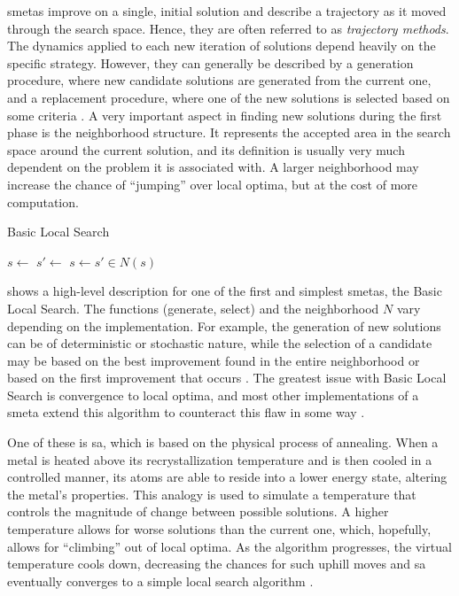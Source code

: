 \Glspl{smeta} improve on a single, initial solution and describe a trajectory as it moved through the search space. Hence, they are often referred to as \textit{trajectory methods}. The dynamics applied to each new iteration of solutions depend heavily on the specific strategy. However, they can generally be described by a generation procedure, where new candidate solutions are generated from the current one, and a replacement procedure, where one of the new solutions is selected based on some criteria \cite{talbi2009metaheuristics}. A very important aspect in finding new solutions during the first phase is the neighborhood structure. It represents the accepted area in the search space around the current solution, and its definition is usually very much dependent on the problem it is associated with. A larger neighborhood may increase the chance of \enquote{jumping} over local optima, but at the cost of more computation.
\begin{algorithm}
	\caption{Basic Local Search}
	\label{alg:basiclocalsearch}
	
	\begin{algorithmic}
		
		\State $s \gets $ 
		\Repeat
		\State $ s'  \gets $ 
		\State $ s \gets s' \in N(s)$
		\EndIf
	\end{algorithmic}
\end{algorithm}

  shows a high-level description for one of the first and simplest \glspl{smeta}, the Basic Local Search. The functions (generate, select) and the neighborhood $N$ vary depending on the implementation. For example, the generation of new solutions can be of deterministic or stochastic nature, while the selection of a candidate may be based on the best improvement found in the entire neighborhood or based on the first improvement that occurs \cite{talbi2009metaheuristics}. The greatest issue with Basic Local Search is convergence to local optima, and most other implementations of a \gls{smeta} extend this algorithm to counteract this flaw in some way \cite{blum2003metaheuristics}. 
 
 One of these is \gls{sa}, which is based on the physical process of annealing. When a metal is heated above its recrystallization temperature and is then cooled in a controlled manner, its atoms are able to reside into a lower energy state, altering the metal's properties. This analogy is used to simulate a temperature that controls the magnitude of change between possible solutions. A higher temperature allows for worse solutions than the current one, which, hopefully, allows for \enquote{climbing} out of local optima. As the algorithm progresses, the virtual temperature cools down, decreasing the chances for such uphill moves and \gls{sa} eventually converges to a simple local search algorithm \cite{blum2003metaheuristics}.
 
